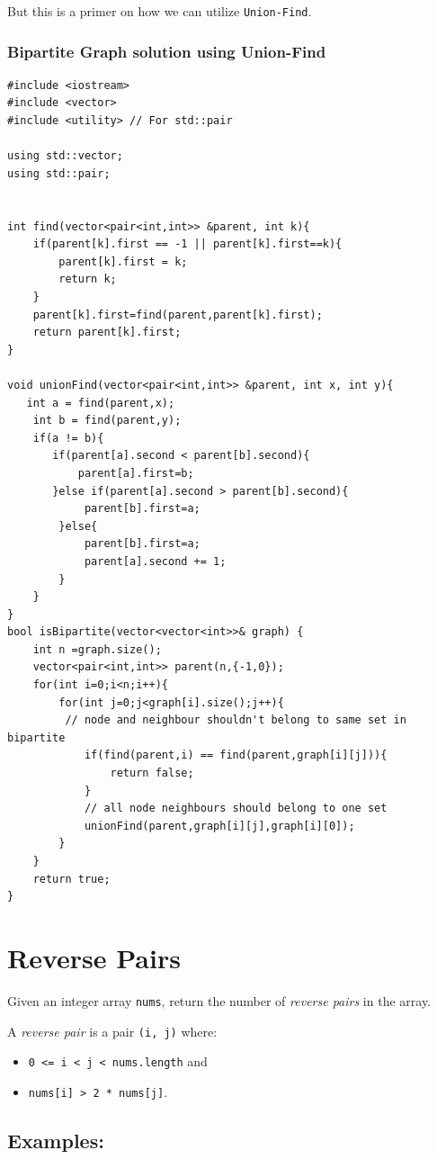 \documentclass[11pt]{article}
\begin{document}
But this is a primer on how we can utilize \texttt{Union-Find}.

\subsubsection{Bipartite Graph solution using Union-Find}
\label{sec:org3727cfe}

\begin{verbatim}
#include <iostream>
#include <vector>
#include <utility> // For std::pair

using std::vector;
using std::pair;


int find(vector<pair<int,int>> &parent, int k){
    if(parent[k].first == -1 || parent[k].first==k){
        parent[k].first = k;
        return k;
    }
    parent[k].first=find(parent,parent[k].first);
    return parent[k].first;
}

void unionFind(vector<pair<int,int>> &parent, int x, int y){
   int a = find(parent,x);
    int b = find(parent,y);
    if(a != b){
       if(parent[a].second < parent[b].second){
		   parent[a].first=b;
	   }else if(parent[a].second > parent[b].second){
			parent[b].first=a;
		}else{
			parent[b].first=a;
			parent[a].second += 1;
		}
    }
}
bool isBipartite(vector<vector<int>>& graph) {
    int n =graph.size();
    vector<pair<int,int>> parent(n,{-1,0});
    for(int i=0;i<n;i++){
        for(int j=0;j<graph[i].size();j++){
		 // node and neighbour shouldn't belong to same set in bipartite
            if(find(parent,i) == find(parent,graph[i][j])){
                return false;
            }
			// all node neighbours should belong to one set
            unionFind(parent,graph[i][j],graph[i][0]);
        }
    }
    return true;
}
\end{verbatim}

\section{Reverse Pairs}
\label{sec:org60b035a}
Given an integer array \texttt{nums}, return the number of \emph{reverse pairs} in the array.

A \emph{reverse pair} is a pair \texttt{(i, j)} where:
\begin{itemize}
\item \texttt{0 <= i < j < nums.length} and
\item \texttt{nums[i] > 2 * nums[j]}.
\end{itemize}

\subsection{Examples:}
\label{sec:orge49be1b}
\end{document}
